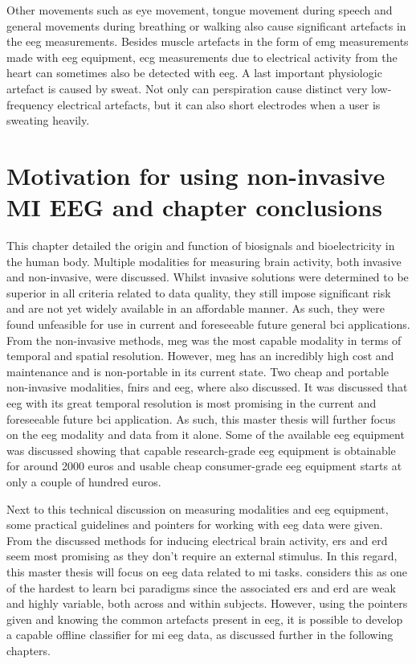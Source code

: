 Other movements such as eye movement, tongue movement during speech and general movements during breathing or walking also cause significant artefacts in the \gls{eeg} measurements.
Besides muscle artefacts in the form of \gls{emg} measurements made with \gls{eeg} equipment, \gls{ecg} measurements due to electrical activity from the heart can sometimes also be detected with \gls{eeg}.
A last important physiologic artefact is caused by sweat.
Not only can perspiration cause distinct very low-frequency electrical artefacts, but it can also short electrodes when a user is sweating heavily.




\section{Motivation for using non-invasive MI EEG and chapter conclusions}
\label{sec:biomedical_signals_summary}

This chapter detailed the origin and function of \glspl{biosignal} and bioelectricity in the human body.
Multiple modalities for measuring brain activity, both invasive and non-invasive, were discussed.
Whilst invasive solutions were determined to be superior in all criteria related to data quality, they still impose significant risk and are not yet widely available in an affordable manner.
As such, they were found unfeasible for use in current and foreseeable future general \gls{bci} applications.
From the non-invasive methods, \gls{meg} was the most capable modality in terms of temporal and spatial resolution.
However, \gls{meg} has an incredibly high cost and maintenance and is non-portable in its current state.
Two cheap and portable non-invasive modalities, \gls{fnirs} and \gls{eeg}, where also discussed.
It was discussed that \gls{eeg} with its great temporal resolution is most promising in the current and foreseeable future \gls{bci} application.
As such, this master thesis will further focus on the \gls{eeg} modality and data from it alone.
Some of the available \gls{eeg} equipment was discussed showing that capable research-grade \gls{eeg} equipment is obtainable for around 2000 euros and usable cheap consumer-grade \gls{eeg} equipment starts at only a couple of hundred euros.

Next to this technical discussion on measuring modalities and \gls{eeg} equipment, some practical guidelines and pointers for working with \gls{eeg} data were given.
From the discussed methods for inducing electrical brain activity, \gls{ers} and \gls{erd} seem most promising as they don't require an external stimulus.
In this regard, this master thesis will focus on \gls{eeg} data related to \gls{mi} tasks.
 considers this as one of the hardest to learn \gls{bci} paradigms since the associated \gls{ers} and \gls{erd} are weak and highly variable, both across and within subjects.
However, using the pointers given and knowing the common artefacts present in \gls{eeg}, it is possible to develop a capable offline classifier for \gls{mi} \gls{eeg} data, as discussed further in the following chapters.
